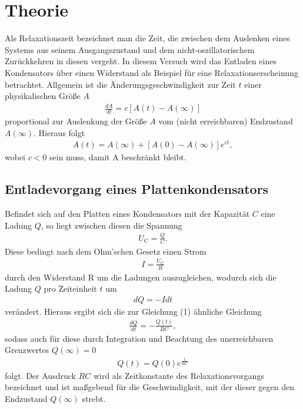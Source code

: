 \section{Theorie}
\label{sec:Theorie}

Als Relaxationszeit bezeichnet man die Zeit, die zwischen dem Auslenken eines Systems aus 
seinem Ausgangszustand und dem nicht-oszillatorischem Zurückkehren in diesen vergeht.
In diesem Versuch wird das Entladen eines Kondensators über einen Widerstand als 
Beispiel für eine Relaxationserscheinung betrachtet.
Allgemein ist die Änderungsgeschwindigkeit zur Zeit $t$ einer physikalischen Größe $A$
\begin{align}
\frac{dA}{dt} = c[A(t)-A(\infty)]
\end{align}
proportional zur Auslenkung der Größe $A$ vom (nicht erreichbaren) Endzustand $A(\infty)$.
Hieraus folgt
\begin{align}
A(t) = A(\infty)+[A(0) - A(\infty)]e^{ct},
\end{align}
wobei $c < 0$ sein muss, damit A beschränkt bleibt.

\subsection{Entladevorgang eines Plattenkondensators}
Befindet sich auf den Platten eines Kondensators mit der Kapazität $C$ eine Ladung $Q$, 
so liegt zwischen diesen die Spannung
\begin{align*}
U_\text{C} = \frac{Q}{C}.
\end{align*}
Diese bedingt nach dem Ohm'schen Gesetz einen Strom
\begin{align*}
I = \frac{U_\text{C}}{R}
\end{align*}
durch den Widerstand R um die Ladungen auszugleichen, wodurch sich die Ladung $Q$ 
pro Zeiteinheit $t$ um
\begin{align*}
dQ = -Idt
\end{align*}
verändert. Hieraus ergibt sich die zur Gleichung (1) ähnliche Gleichung
\begin{align}
\frac{dQ}{dt} = -\frac{Q(t)}{RC},
\end{align}
sodass auch für diese durch Integration und Beachtung des unerreichbaren Grenzwertes $Q(\infty) = 0$
\begin{align}
Q(t) = Q(0)e^{\frac{1}{RC}}
\end{align}
folgt. Der Ausdruck $RC$ wird als Zeitkonstante des Relaxationsvorgangs bezeichnet und 
ist maßgebend für die Geschwindigkeit, mit der dieser gegen den Endzustand $Q(\infty)$ strebt.

